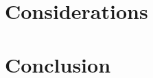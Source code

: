 \documentclass[conference]{IEEEtran}
\begin{document}


\section{Considerations}
\label{considerations}
\section{Conclusion}
\label{conclusion}



\newpage


% 
% 
% 
% 
\end{document}
